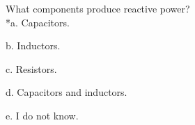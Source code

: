 
What components produce reactive power?\\

*a. Capacitors.

b. Inductors.

c. Resistors.

d. Capacitors and inductors.

e. I do not know.\\

